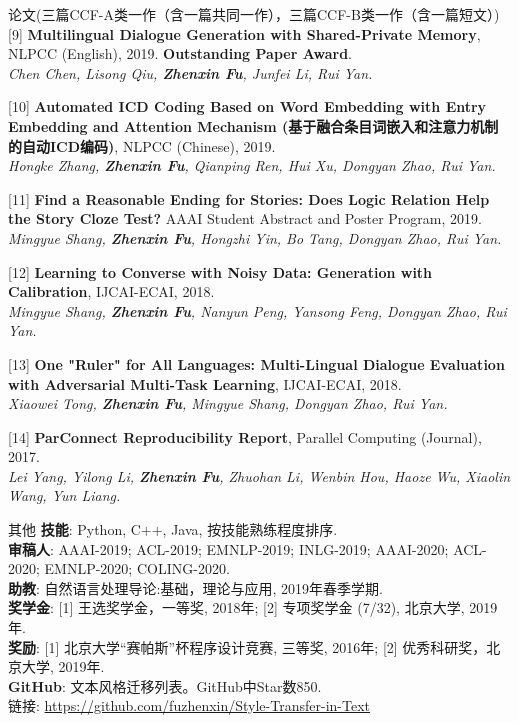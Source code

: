 \documentclass{resume} %
\begin{document}
\begin{rSection}{论文(三篇CCF-A类一作（含一篇共同一作），三篇CCF-B类一作（含一篇短文）)}
    [9] \textbf{Multilingual Dialogue Generation with Shared-Private Memory}, NLPCC (English), 2019. \textbf{Outstanding Paper Award}. \\
    {\it Chen Chen, Lisong Qiu, \textbf{Zhenxin Fu}, Junfei Li, Rui Yan. }

    [10] \textbf{Automated ICD Coding Based on Word Embedding with Entry Embedding and Attention Mechanism (基于融合条目词嵌入和注意力机制的自动ICD编码)}, NLPCC (Chinese), 2019. \\
    {\it Hongke Zhang, \textbf{Zhenxin Fu}, Qianping Ren, Hui Xu, Dongyan Zhao, Rui Yan.}

    [11] \textbf{Find a Reasonable Ending for Stories: Does Logic Relation Help the Story Cloze Test?} AAAI Student Abstract and Poster Program, 2019. \\
    {\it Mingyue Shang, \textbf{Zhenxin Fu}, Hongzhi Yin, Bo Tang, Dongyan Zhao, Rui Yan.}

    [12] \textbf{Learning to Converse with Noisy Data: Generation with Calibration}, IJCAI-ECAI, 2018. \\
    {\it Mingyue Shang, \textbf{Zhenxin Fu}, Nanyun Peng, Yansong Feng, Dongyan Zhao, Rui Yan.} 

    [13] \textbf{One "Ruler" for All Languages: Multi-Lingual Dialogue Evaluation with Adversarial Multi-Task Learning}, IJCAI-ECAI, 2018. \\
    {\it Xiaowei Tong, \textbf{Zhenxin Fu}, Mingyue Shang, Dongyan Zhao, Rui Yan.}

    [14] \textbf{ParConnect Reproducibility Report}, Parallel Computing (Journal), 2017.\\
    {\it Lei Yang, Yilong Li, \textbf{Zhenxin Fu}, Zhuohan Li, Wenbin Hou, Haoze Wu, Xiaolin Wang, Yun Liang.}
\end{rSection}

\begin{rSection}{其他}
    \textbf{技能}: Python, C++, Java, 按技能熟练程度排序. \\
    \textbf{审稿人}: AAAI-2019; ACL-2019; EMNLP-2019; INLG-2019; AAAI-2020; ACL-2020; EMNLP-2020; COLING-2020. \\
    \textbf{助教}: 自然语言处理导论:基础，理论与应用, 2019年春季学期. \\
    \textbf{奖学金}: [1] 王选奖学金，一等奖, 2018年; [2] 专项奖学金 (7/32), 北京大学, 2019年. \\
    \textbf{奖励}: [1] 北京大学``赛帕斯''杯程序设计竞赛, 三等奖, 2016年; [2] 优秀科研奖，北京大学, 2019年. \\
    \textbf{GitHub}: 文本风格迁移列表。GitHub中Star数850. \\链接: \url{https://github.com/fuzhenxin/Style-Transfer-in-Text}
\end{rSection}
\end{document}
